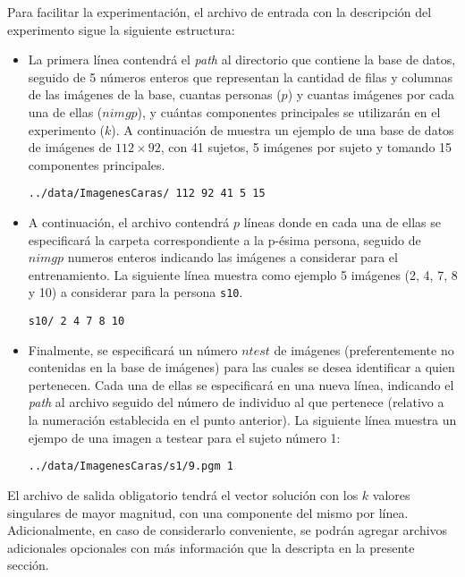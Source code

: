 \documentclass[11pt, a4paper]{article}
\begin{document}
Para facilitar la experimentaci\'on, el archivo de entrada con la descripci\'on del experimento sigue la siguiente
estructura:
\begin{itemize}
\item La primera l\'inea contendr\'a el \emph{path} al directorio que contiene la base de datos, seguido de 5 n\'umeros
enteros que representan la cantidad de filas y columnas de las im\'agenes de la base, cuantas personas ($p$) y cuantas
im\'agenes por cada una de ellas ($nimgp$), y cu\'antas componentes principales se utilizar\'an en el experimento ($k$). 
A continuaci\'on de muestra un ejemplo de una base de datos de im\'agenes de $112 \times 92$, con 41 sujetos, 5 
im\'agenes por sujeto y tomando 15 componentes principales.

\begin{verbatim}
../data/ImagenesCaras/ 112 92 41 5 15
\end{verbatim}

\item A continuaci\'on, el archivo contendr\'a $p$ l\'ineas donde en cada una de ellas se especificar\'a la carpeta
correspondiente a la p-\'esima persona, seguido de $nimgp$ numeros enteros indicando las im\'agenes a considerar para el
entrenamiento. La siguiente l\'inea muestra como ejemplo 5 im\'agenes (2, 4, 7, 8 y 10) a considerar para la persona
\verb+s10+.

\begin{verbatim}
s10/ 2 4 7 8 10
\end{verbatim}

\item Finalmente, se especificar\'a un n\'umero $ntest$ de im\'agenes (preferentemente no contenidas en la base de
im\'agenes) para las cuales se desea identificar a quien pertenecen. Cada una de ellas se especificar\'a en una nueva
l\'inea, indicando el \emph{path} al archivo seguido del n\'umero de individuo al que pertenece (relativo a la
numeraci\'on establecida en el punto anterior). La siguiente l\'inea muestra un ejempo de una imagen a testear para el
sujeto n\'umero 1:

\begin{verbatim}
../data/ImagenesCaras/s1/9.pgm 1
\end{verbatim}
\end{itemize}

El archivo de salida obligatorio tendr\'a el vector soluci\'on con los $k$ valores singulares de mayor magnitud, con una
componente del mismo por l\'inea. Adicionalmente, en caso de considerarlo conveniente, se podr\'an agregar archivos
adicionales opcionales con m\'as informaci\'on que la descripta en la presente secci\'on.
\end{document}
